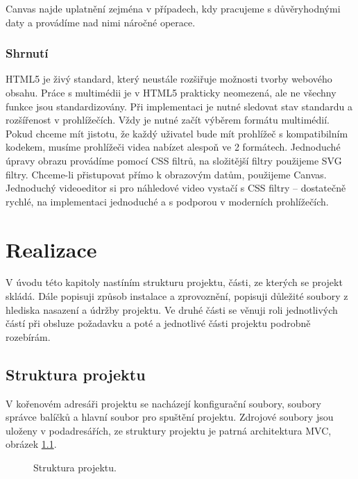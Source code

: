 Canvas najde uplatnění zejména v případech, kdy pracujeme s důvěryhodnými daty a provádíme nad nimi náročné operace. 

\subsection{Shrnutí}
HTML5 je živý standard, který neustále rozšiřuje možnosti tvorby webového obsahu. Práce s multimédii je v HTML5 prakticky neomezená, ale ne všechny funkce jsou standardizovány. Při implementaci je nutné sledovat stav standardu a rozšířenost v prohlížečích. Vždy je nutné začít výběrem formátu multimédií. Pokud chceme mít jistotu, že každý uživatel bude mít prohlížeč s kompatibilním kodekem, musíme prohlížeči videa nabízet alespoň ve 2 formátech. Jednoduché úpravy obrazu provádíme pomocí CSS filtrů, na složitější filtry použijeme SVG filtry. Chceme-li přistupovat přímo k obrazovým datům, použijeme Canvas. Jednoduchý videoeditor si pro náhledové video vystačí s CSS filtry -- dostatečně rychlé, na implementaci jednoduché a s podporou v moderních prohlížečích.

\chapter{Realizace}
V úvodu této kapitoly nastíním strukturu projektu, části, ze kterých se projekt skládá. Dále popisuji způsob instalace a zprovoznění, popisuji důležité soubory z hlediska nasazení a údržby projektu. Ve druhé části se věnuji roli jednotlivých částí při obsluze požadavku a poté a jednotlivé části projektu podrobně rozebírám.

\section{Struktura projektu}
V kořenovém adresáři projektu se nacházejí konfigurační soubory, soubory správce balíčků a hlavní soubor pro spuštění projektu. Zdrojové soubory jsou uloženy v podadresářích, ze struktury projektu je patrná architektura MVC, obrázek \ref{img:structure}.
\begin{figure}[h]
	\centering
	\caption{Struktura projektu.}\label{img:structure}
\end{figure}

